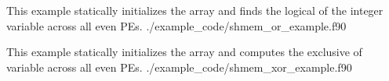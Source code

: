 \begin{apidefinition}
\begin{apiexamples}
\apifexample
    {This \Fortran example statically initializes the  array and finds
    the logical  of the integer variable  across all even
    \acp{PE}.}
    {./example_code/shmem_or_example.f90}
    {}

\apifexample
    {This \Fortran example statically initializes the  array and
    computes the exclusive  of variable  across all even
    \acp{PE}.}
    {./example_code/shmem_xor_example.f90}
    {}

\end{apiexamples}

\end{apidefinition}
